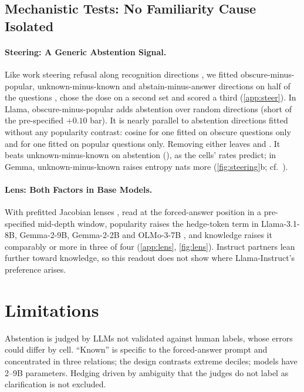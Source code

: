 \documentclass{article}
\begin{document}
\subsection{Mechanistic Tests: No Familiarity Cause Isolated}
\label{sec:mech}

\paragraph{Steering: A Generic Abstention Signal.} Like work steering refusal along recognition directions \citep{ferrando2025iknow,brzezinka2026familiarity}, we fitted obscure-minus-popular, unknown-minus-known and abstain-minus-answer directions on half of the questions \citep{arditi2024refusal,rimsky2024caa}, chose the dose on a second set and scored a third (\cref{app:steer}). In Llama, obscure-minus-popular adds \svLlamaDOne{} \svLlamaDOneCI{} abstention over random directions (short of the pre-specified $+0.10$ bar). It is nearly parallel to abstention directions fitted without any popularity contrast: cosine \wlLlamaCos{} for one fitted on obscure questions only and \gaCos{} for one fitted on popular questions only. Removing either leaves \wlLlamaDTwo{} \wlLlamaDTwoCI{} and \gaPerp{} \gaPerpCI. It beats unknown-minus-known on abstention (\svLlamaDThree), as the cells' rates predict; in Gemma, unknown-minus-known raises entropy \svGemmaDFour{} \svGemmaDFourCI{} nats more (\cref{fig:steering}b; cf.\ \citealp{che2026steering}).

\paragraph{Lens: Both Factors in Base Models.} With prefitted Jacobian lenses \citep{gurnee2026workspace}, read at the forced-answer position in a pre-specified mid-depth window, popularity raises the hedge-token term in Llama-3.1-8B, Gemma-2-9B, Gemma-2-2B and OLMo-3-7B \citep{olmo3}, and knowledge raises it comparably or more in three of four (\cref{app:lens}, \cref{fig:lens}). Instruct partners lean further toward knowledge, so this readout does not show where Llama-Instruct's preference arises.

\section{Limitations}

Abstention is judged by LLMs not validated against human labels, whose errors could differ by cell. ``Known'' is specific to the forced-answer prompt and concentrated in three relations; the design contrasts extreme deciles; models have 2--9B parameters. Hedging driven by ambiguity that the judges do not label as clarification is not excluded.
\end{document}

